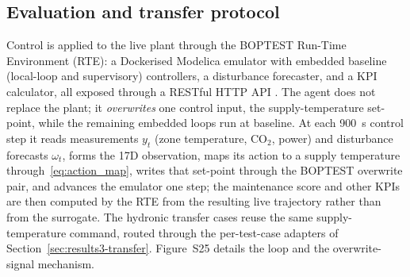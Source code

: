 \documentclass[a4paper,fleqn]{cas-sc}
\newcommand{\suppref}[1]{#1}
\begin{document}
\subsection{Evaluation and transfer protocol}\label{ssec:m-eval}
Control is applied to the live plant through the BOPTEST Run-Time Environment (RTE): a Dockerised Modelica emulator with embedded baseline (local-loop and supervisory) controllers, a disturbance forecaster, and a KPI calculator, all exposed through a RESTful HTTP API \citep{Blum2021BOPTEST}. The agent does not replace the plant; it \emph{overwrites} one control input, the supply-temperature set-point, while the remaining embedded loops run at baseline. At each \SI{900}{\second} control step it reads measurements $y_t$ (zone temperature, CO$_2$, power) and disturbance forecasts $\omega_t$, forms the 17D observation, maps its action to a supply temperature through~\eqref{eq:action_map}, writes that set-point through the BOPTEST overwrite pair, and advances the emulator one step; the maintenance score and other KPIs are then computed by the RTE from the resulting live trajectory rather than from the surrogate. The hydronic transfer cases reuse the same supply-temperature command, routed through the per-test-case adapters of Section~\ref{sec:results3-transfer}. Figure~\suppref{S25} details the loop and the overwrite-signal mechanism.
\end{document}
